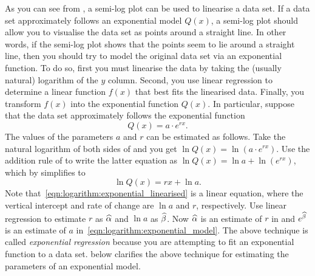 \documentclass[a4paper,oneside,12pt]{article}
\begin{document}
As you can see from , a
semi-log plot can be used to linearise a data set.  If a data set
approximately follows an exponential model $Q(x)$, a semi-log plot
should allow you to visualise the data set as points around a straight
line.  In other words, if the semi-log plot shows that the points seem
to lie around a straight line, then you should try to model the
original data set via an exponential function.  To do so, first you
must linearise the data by taking the (usually natural) logarithm of
the $y$ column.  Second, you use linear regression to determine a
linear function $f(x)$ that best fits the linearised data.  Finally,
you transform $f(x)$ into the exponential function $Q(x)$.  In
particular, suppose that the data set approximately follows the
exponential function
\begin{equation}
\label{eqn:logarithm:exponential_model}
Q(x)
=
a \cdot e^{rx}.
\end{equation}
The values of the parameters $a$ and $r$ can be estimated as follows.
Take the natural logarithm of both sides of
 and you get
$\ln Q(x) = \ln (a \cdot e^{rx})$.  Use the addition rule of
to write the latter equation as $\ln Q(x) = \ln a + \ln (e^{rx})$,
which by
simplifies to
\begin{equation}
\label{eqn:logarithm:exponential_linearised}
\ln Q(x)
=
rx + \ln a.
\end{equation}
Note that~\eqref{eqn:logarithm:exponential_linearised} is a linear
equation, where the vertical intercept and rate of change are $\ln a$
and $r$, respectively.  Use linear regression to estimate $r$ as
$\widehat{\alpha}$ and $\ln a$ as $\widehat{\beta}$.  Now $\widehat{\alpha}$ is an estimate
of $r$ in  and
$e^{\widehat{\beta}}$ is an estimate of $a$
in~\eqref{eqn:logarithm:exponential_model}.  The above technique is
called \emph{exponential regression} because you are attempting to fit
an exponential function to a data set.
 below clarifies the above
technique for estimating the parameters of an exponential model.

\begin{table}[!htbp]
\centering

\caption{%
  The total length $x$ versus weight $w$ of $42$ rainbow trout.  Total
  length is measured in millimetres and weight is measured in grams.
  Each $y_i$ is the natural logarithm of $w_i$.  If $\xbar$ and
  $\ybar$ are the means of the $x$ and $y$ columns, respectively, then
  $d(x_i) = x_i - \xbar$ and $d(y_i) = y_i - \ybar$.  The whole table
  shows the detailed calculation necessary for the linear regression
  of the $x$ and $y$ columns.
}
\label{tab:logarithm:rainbow_trout}
\end{table}
\end{document}
